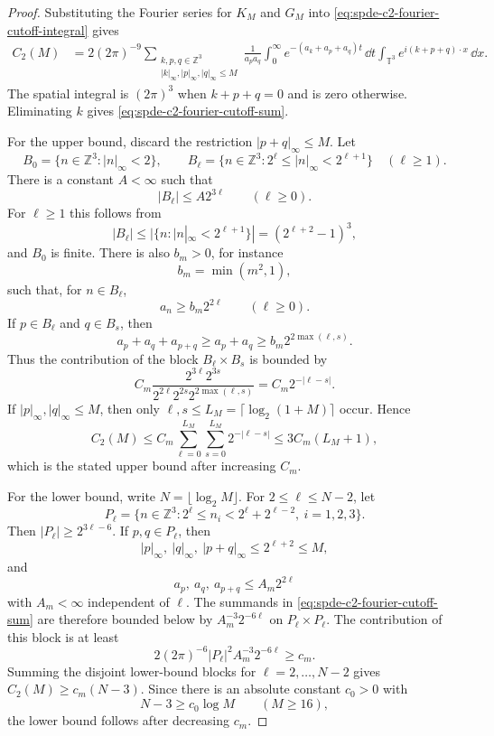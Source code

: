\begin{proof}
Substituting the Fourier series for \(K_M\) and \(G_M\) into
\eqref{eq:spde-c2-fourier-cutoff-integral} gives
\[
\begin{aligned}
  C_2(M)
  &=
  2(2\pi)^{-9}
  \sum_{\substack{k,p,q\in\mathbb Z^3\\
                  |k|_\infty,|p|_\infty,|q|_\infty\leq M}}
  \frac{1}{a_pa_q}
  \int_0^\infty e^{-(a_k+a_p+a_q)t}\,\dd t
  \int_{\mathbb T^3}e^{i(k+p+q)\cdot x}\,\dd x .
\end{aligned}
\]
The spatial integral is \((2\pi)^3\) when \(k+p+q=0\) and is zero otherwise.
Eliminating \(k\) gives \eqref{eq:spde-c2-fourier-cutoff-sum}.

For the upper bound, discard the restriction \(|p+q|_\infty\leq M\).  Let
\[
  B_0=\{n\in\mathbb Z^3:|n|_\infty<2\},
  \qquad
  B_\ell=\{n\in\mathbb Z^3:2^\ell\leq |n|_\infty<2^{\ell+1}\}
  \quad(\ell\geq1).
\]
There is a constant \(A<\infty\) such that
\[
  |B_\ell|\leq A2^{3\ell}\qquad(\ell\geq0).
\]
For \(\ell\geq1\) this follows from
\[
  |B_\ell|\leq |\{n:|n|_\infty<2^{\ell+1}\}|
  =(2^{\ell+2}-1)^3,
\]
and \(B_0\) is finite.  There is also \(b_m>0\), for instance
\[
  b_m=\min(m^2,1),
\]
such that, for \(n\in B_\ell\),
\[
  a_n\geq b_m2^{2\ell}\qquad(\ell\geq0).
\]
If \(p\in B_\ell\) and \(q\in B_s\), then
\[
  a_p+a_q+a_{p+q}\geq a_p+a_q
  \geq b_m2^{2\max(\ell,s)} .
\]
Thus the contribution of the block \(B_\ell\times B_s\) is bounded by
\[
  C_m
  \frac{2^{3\ell}2^{3s}}
       {2^{2\ell}2^{2s}2^{2\max(\ell,s)}}
  =
  C_m2^{-|\ell-s|}.
\]
If \(|p|_\infty,|q|_\infty\leq M\), then only
\(\ell,s\leq L_M=\lceil\log_2(1+M)\rceil\) occur.  Hence
\[
  C_2(M)
  \leq
  C_m
  \sum_{\ell=0}^{L_M}\sum_{s=0}^{L_M}2^{-|\ell-s|}
  \leq
  3C_m(L_M+1),
\]
which is the stated upper bound after increasing \(C_m\).

For the lower bound, write \(N=\lfloor\log_2M\rfloor\).  For
\(2\leq \ell\leq N-2\), let
\[
  P_\ell
  =
  \{n\in\mathbb Z^3:
    2^\ell\leq n_i<2^\ell+2^{\ell-2},\ i=1,2,3\}.
\]
Then \(|P_\ell|\geq 2^{3\ell-6}\).  If \(p,q\in P_\ell\), then
\[
  |p|_\infty,\ |q|_\infty,\ |p+q|_\infty\leq 2^{\ell+2}\leq M,
\]
and
\[
  a_p,\ a_q,\ a_{p+q}\leq A_m2^{2\ell}
\]
with \(A_m<\infty\) independent of \(\ell\).  The summands in
\eqref{eq:spde-c2-fourier-cutoff-sum} are therefore bounded below by
\(A_m^{-3}2^{-6\ell}\) on \(P_\ell\times P_\ell\).  The contribution of
this block is at least
\[
  2(2\pi)^{-6}|P_\ell|^2A_m^{-3}2^{-6\ell}
  \geq c_m .
\]
Summing the disjoint lower-bound blocks for
\(\ell=2,\ldots,N-2\) gives \(C_2(M)\geq c_m(N-3)\).  Since
there is an absolute constant \(c_0>0\) with
\[
  N-3\geq c_0\log M\qquad(M\geq16),
\]
the lower bound follows after decreasing \(c_m\).
\end{proof}

